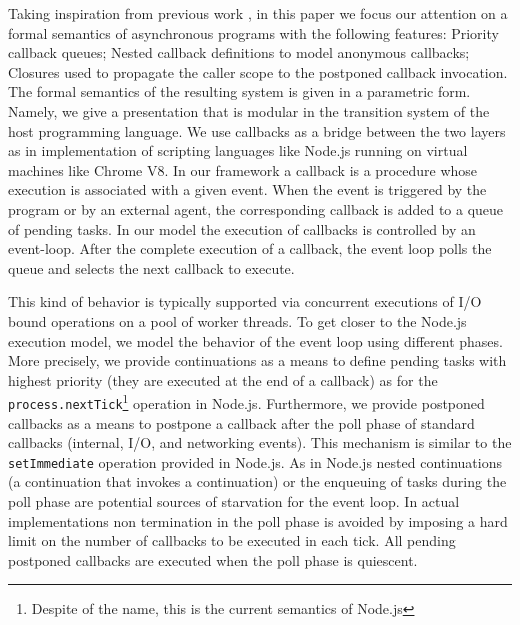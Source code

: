 Taking inspiration from previous work \cite{ASOP16,CV07,GM09,GM12,GMB15,GMR09,GHR15,SV06}, in this paper we focus our attention on a formal semantics of asynchronous programs with the following features:  Priority callback queues; Nested callback definitions to model anonymous callbacks; Closures used to propagate the caller scope to the postponed callback invocation.
The formal semantics of the resulting system is given in a parametric form. Namely, we give a presentation that is modular in the transition system  of the host programming language. We use callbacks as a bridge between the two layers as in implementation of scripting languages like Node.js running on virtual machines like Chrome V8.
In our framework a callback is a procedure whose execution is associated with a given event. When the event is triggered by the program or by an external agent, the corresponding callback is added to a queue of pending tasks. In our model the execution of callbacks is controlled by an event-loop. After the complete execution of a callback, the event loop polls the queue and selects the next callback to execute. 

This kind of behavior is typically supported via concurrent executions of I/O bound operations on a pool of worker threads.  To get closer to the Node.js execution model, we model the behavior of the event loop using different phases. More precisely, we provide continuations as a means to define pending tasks with highest priority (they are executed at the end of a callback) as for the {\tt process.nextTick}\footnote{Despite of the name, this is the current semantics of Node.js} operation in Node.js.   Furthermore, we provide postponed callbacks as a means to postpone a callback after the poll phase of standard callbacks (internal, I/O, and networking events). This mechanism is similar to the {\tt setImmediate} operation provided in Node.js. 
As in Node.js nested continuations (a continuation that invokes a continuation) or the enqueuing of tasks  during the poll phase are potential sources of starvation for the event loop. In actual implementations non termination in the poll phase is avoided by imposing a hard limit on the number of callbacks to be executed in each tick. All pending postponed callbacks are executed when the poll phase is quiescent.

